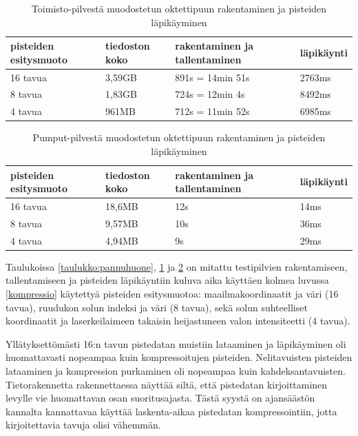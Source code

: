 \begin{table}[h]
    \begin{tabular}{llll}
    \hline
    pisteiden esitysmuoto & tiedoston koko & rakentaminen ja tallentaminen & läpikäynti \\ \hline
    16 tavua & 3,59GB              & 891s = 14min 51s              & 2763ms     \\
    8 tavua  & 1,83GB              & 724s = 12min 4s               & 8492ms     \\
    4 tavua & 961MB               & 712s = 11min 52s              & 6985ms     \\ \hline
    \end{tabular}
    \caption{Toimisto-pilvestä muodostetun oktettipuun rakentaminen ja pisteiden läpikäyminen}
    \label{taulukko:toimisto}
\end{table}

\begin{table}[h]
    \begin{tabular}{llll}
    \hline
    pisteiden esitysmuoto & tiedoston koko & rakentaminen ja tallentaminen & läpikäynti \\ \hline
    16 tavua       & 18,6MB              & 12s                           & 14ms       \\
    8 tavua      & 9,57MB              & 10s                           & 36ms       \\
    4 tavua      & 4,94MB              & 9s                            & 29ms       \\ \hline
    \end{tabular}
    \caption{Pumput-pilvestä muodostetun oktettipuun rakentaminen ja pisteiden läpikäyminen}
    \label{taulukko:pumput}
\end{table}

Taulukoissa \ref{taulukko:pannuhuone}, \ref{taulukko:toimisto} ja \ref{taulukko:pumput} on mitattu testipilvien rakentamiseen, tallentamiseen ja pisteiden läpikäyntiin kuluva aika käyttäen kolmea luvussa \ref{kompressio} käytettyä pisteiden esitysmuotoa: maailmakoordinaatit ja väri (16 tavua), ruudukon solun indeksi ja väri (8 tavua), sekä solun suhteelliset koordinaatit ja laserkeilaimeen takaisin heijastuneen valon intensiteetti (4 tavua). 

Yllätyksettömästi 16:n tavun pistedatan muistiin lataaminen ja läpikäyminen oli huomattavasti nopeampaa kuin kompressoitujen pisteiden. Nelitavuisten pisteiden lataaminen ja kompression purkaminen oli nopeampaa kuin kahdeksantavuisten. Tietorakennetta rakennettaessa näyttää siltä, että pistedatan kirjoittaminen levylle vie huomattavan osan suoritusajasta. Tästä syystä on ajansäästön kannalta kannattavaa käyttää laskenta-aikaa pistedatan kompressointiin, jotta kirjoitettavia tavuja olisi vähemmän. 

